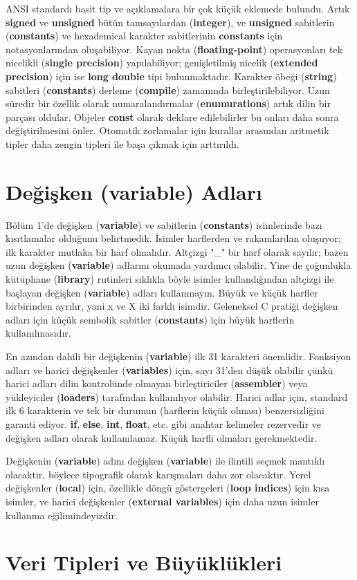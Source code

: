\documentclass[a4paper,12pt,oneside]{book}
\begin{document}
\par ANSI standardı basit tip ve açıklamalara bir çok küçük eklemede bulundu. Artık \textbf{signed} ve \textbf{unsigned} bütün tamsayılardan (\textbf{integer}), ve \textbf{unsigned} sabitlerin (\textbf{constants}) ve hexademical karakter sabitlerinin \textbf{constants} için notasyonlarından oluşabiliyor. Kayan nokta (\textbf{floating-point}) operasyonları tek nicelikli (\textbf{single precision}) yapılabiliyor; genişletilmiş nicelik (\textbf{extended precision}) için ise \textbf{long double} tipi bulunmaktadır. Karakter öbeği (\textbf{string}) sabitleri (\textbf{constants}) derleme (\textbf{compile}) zamanında birleştirilebiliyor. Uzun süredir bir özellik olarak numaralandırmalar (\textbf{enumurations}) artık dilin bir parçası oldular. Objeler \textbf{const} olarak deklare edilebilirler bu onları daha sonra değiştirilmesini önler. Otomatik zorlamalar için kurallar arasından aritmetik tipler daha zengin tipleri ile başa çıkmak için arttırıldı. \\

\section{Değişken (\textbf{variable}) Adları}

Bölüm 1'de değişken (\textbf{variable}) ve sabitlerin (\textbf{constants}) isimlerinde bazı kısıtlamalar olduğunu belirtmedik. İsimler harflerden ve rakamlardan oluşuyor; ilk karakter mutlaka bir harf olmalıdır. Altçizgi "\_" bir harf olarak sayılır; bazen uzun değişken (\textbf{variable}) adlarını okumada yardımcı olabilir. Yine de çoğunlukla kütüphane (\textbf{library}) rutinleri sıklıkla böyle isimler kullandığından altçizgi ile başlayan değişken (\textbf{variable}) adları kullanmayın. Büyük ve küçük harfler birbirinden ayrılır, yani x ve X iki farklı isimdir. Geleneksel C pratiği değişken adları için küçük sembolik sabitler (\textbf{constants}) için büyük harflerin kullanılmasıdır.
\par En azından dahili bir değişkenin (\textbf{variable}) ilk 31 karakteri önemlidir. Fonksiyon adları ve harici değişkenler (\textbf{variables}) için, sayı 31'den düşük olabilir çünkü harici adları dilin kontrolünde olmayan birleştiriciler (\textbf{assembler}) veya yükleyiciler (\textbf{loaders}) tarafından kullanılıyor olabilir. Harici adlar için, standard ilk 6 karakterin ve tek bir durumun (harflerin küçük olması) benzersizliğini garanti ediyor. \textbf{if}, \textbf{else}, \textbf{int}, \textbf{float}, etc. gibi anahtar kelimeler rezervedir ve değişken adları olarak kullanılamaz. Küçük harfli olmaları gerekmektedir.
\par Değişkenin (\textbf{variable}) adını değişken (\textbf{variable}) ile ilintili seçmek mantıklı olacaktır, böylece tipografik olarak karışmaları daha zor olacaktır. Yerel değişkenler (\textbf{local}) için, özellikle döngü göstergeleri (\textbf{loop indices}) için kısa isimler, ve harici değişkenler (\textbf{external variables}) için daha uzun isimler kullanma eğilimindeyizdir. \\

\section{Veri Tipleri ve Büyüklükleri}
\end{document}
